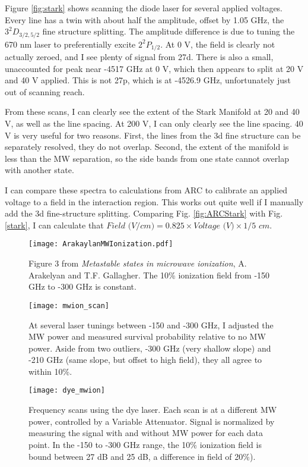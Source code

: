 \documentclass{article}
\begin{document}
Figure \ref{fig:stark} shows scanning the diode laser for several applied voltages. Every line has a twin with about half the amplitude, offset by 1.05 GHz, the $3^2D_{3/2,5/2}$ fine structure splitting. The amplitude difference is due to tuning the 670 nm laser to preferentially excite $2^2P_{1/2}$. At 0 V, the field is clearly not actually zeroed, and I see plenty of signal from 27d. There is also a small, unaccounted for peak near -4517 GHz at 0 V, which then appears to split at 20 V and 40 V applied. This is not 27p, which is at -4526.9 GHz, unfortunately just out of scanning reach.

From these scans, I can clearly see the extent of the Stark Manifold at 20 and 40 V, as well as the line spacing. At 200 V, I can only clearly see the line spacing. 40 V is very useful for two reasons. First, the lines from the 3d fine structure can be separately resolved, they do not overlap. Second, the extent of the manifold is less than the MW separation, so the side bands from one state cannot overlap with another state.


I can compare these spectra to calculations from ARC to calibrate an applied voltage to a field in the interaction region. This works out quite well if I manually add the 3d fine-structure splitting. Comparing Fig. \ref{fig:ARCStark} with Fig. \ref{stark}, I can calculate that $\textit{Field (V/cm)} = 0.825 \times \textit{Voltage (V)} \times 1/\textit{5 cm}$.


\begin{figure}
	\texttt{[image: ArakaylanMWIonization.pdf]}
	\caption{Figure 3 from \textit{Metastable states in microwave ionization}, A. Arakelyan and T.F. Gallagher. The 10\% ionization field from -150 GHz to -300 GHz is constant.}
	\label{fig:Arak}
\end{figure}

\begin{figure}
	\texttt{[image: mwion\_scan]}
	\caption{At several laser tunings between -150 and -300 GHz, I adjusted the MW power and measured survival probability relative to no MW power. Aside from two outliers, -300 GHz (very shallow slope) and -210 GHz (same slope, but offset to high field), they all agree to within 10\%.}
	\label{fig:mwion}
\end{figure}

\begin{figure}
	\texttt{[image: dye\_mwion]}
	\caption{Frequency scans using the dye laser. Each scan is at a different MW power, controlled by a Variable Attenuator. Signal is normalized by measuring the signal with and without MW power for each data point. In the -150 to -300 GHz range, the 10\% ionization field is bound between 27 dB and 25 dB, a difference in field of 20\%).}
	\label{fig:dyemwion}
\end{figure}
\end{document}
